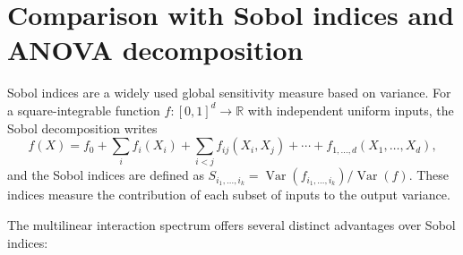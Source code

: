 \section{Comparison with Sobol indices and ANOVA decomposition}
\label{sec:sobol-comparison}

Sobol indices are a widely used global sensitivity measure based on variance. For a square-integrable function \(f:[0,1]^d\to\mathbb{R}\) with independent uniform inputs, the Sobol decomposition writes
\[
f(X) = f_0 + \sum_i f_i(X_i) + \sum_{i<j} f_{ij}(X_i,X_j) + \cdots + f_{1,\ldots,d}(X_1,\ldots,X_d),
\]
and the Sobol indices are defined as \(S_{i_1,\ldots,i_k} = \operatorname{Var}(f_{i_1,\ldots,i_k})/\operatorname{Var}(f)\). These indices measure the contribution of each subset of inputs to the output variance.

The multilinear interaction spectrum offers several distinct advantages over Sobol indices:

